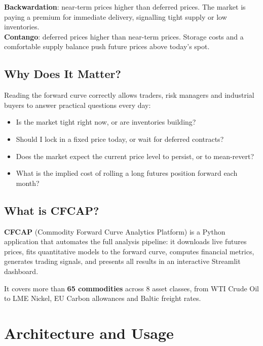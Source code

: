 \documentclass[11pt,a4paper]{article}
\newenvironment{keybox}[1]{%
  \begin{tcolorbox}[
    colback=boxbg, colframe=accentblue,
    fonttitle=\bfseries\small, title=#1,
    left=8pt, right=8pt, top=6pt, bottom=6pt, boxrule=0.5pt
  ]
}{\end{tcolorbox}}
\begin{document}
\begin{keybox}{Key definitions}
\textbf{Backwardation}: near-term prices higher than deferred prices. The market is paying a premium for immediate delivery, signalling tight supply or low inventories.\\[4pt]
\textbf{Contango}: deferred prices higher than near-term prices. Storage costs and a comfortable supply balance push future prices above today's spot.
\end{keybox}

\subsection{Why Does It Matter?}

Reading the forward curve correctly allows traders, risk managers and industrial buyers to answer practical questions every day:

\begin{itemize}[itemsep=4pt]
\item Is the market tight right now, or are inventories building?
\item Should I lock in a fixed price today, or wait for deferred contracts?
\item Does the market expect the current price level to persist, or to mean-revert?
\item What is the implied cost of rolling a long futures position forward each month?
\end{itemize}

\subsection{What is CFCAP?}

\textbf{CFCAP} (Commodity Forward Curve Analytics Platform) is a Python application that automates the full analysis pipeline: it downloads live futures prices, fits quantitative models to the forward curve, computes financial metrics, generates trading signals, and presents all results in an interactive Streamlit dashboard.

It covers more than \textbf{65 commodities} across 8 asset classes, from WTI Crude Oil to LME Nickel, EU Carbon allowances and Baltic freight rates.

\section{Architecture and Usage}
\end{document}
